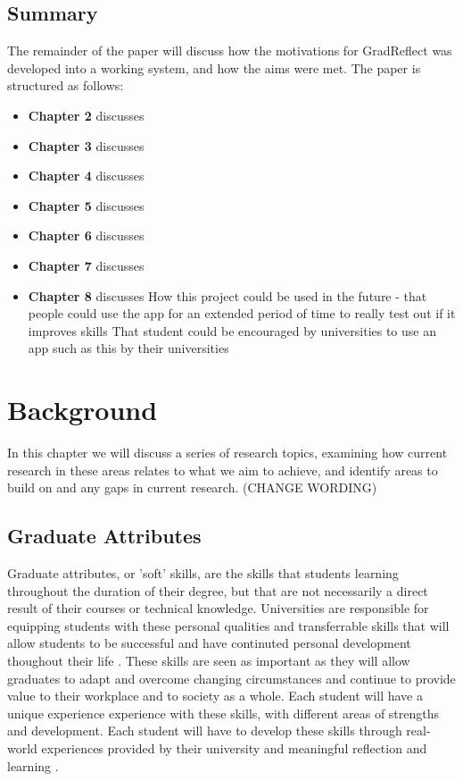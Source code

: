\documentclass{l4proj}
\begin{document}
\section{Summary}
The remainder of the paper will discuss how the motivations for GradReflect was developed
into a working system, and how the aims were met.
The paper is structured as follows:
\begin{itemize}
    \item
    \textbf{Chapter 2} discusses
    \item
    \textbf{Chapter 3} discusses
    \item
    \textbf{Chapter 4} discusses
    \item
    \textbf{Chapter 5} discusses
    \item
    \textbf{Chapter 6} discusses
    \item
    \textbf{Chapter 7} discusses
    \item
    \textbf{Chapter 8} discusses
    How this project could be used in the future - that people could use the app for an extended period of 
time to really test out if it improves skills
That student could be encouraged by universities to use an app such as this by their universities
\end{itemize}


\chapter{Background}

In this chapter we will discuss a series of research topics, examining how current research in these areas relates to what we aim 
to achieve, and identify areas to build on and any gaps in current research. (CHANGE WORDING)

\section{Graduate Attributes}

Graduate attributes, or 'soft' skills, are the skills that students learning throughout the duration of their degree, but that are not 
necessarily a direct result of their courses or technical knowledge. Universities are responsible for equipping students with these personal qualities and 
transferrable skills that will allow students to be successful and have continuted personal development thoughout their life 
\citep{stirling_graduate_nodate}. These skills are seen as important as they will allow graduates to adapt and overcome changing 
circumstances and continue to provide value to their workplace and to society as a whole. Each student will have a unique experience
experience with these skills, with different areas of strengths and development. Each student will have to develop these skills through
real-world experiences provided by their university and meaningful reflection and learning \citep{edinburgh_definition_skills}.
\end{document}
